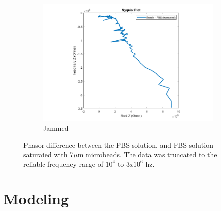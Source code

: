 \begin{figure}[h]
    \begin{subfigure}[b]{\textwidth}
        \centering
        \includegraphics[width=\textwidth]{images/IS_data_beads-PBS_nyquist.png}
        \caption{Jammed}
    \end{subfigure}
    \caption[Truncated phasor difference between PBS, and micro-bead saturated PBS.]{Phasor difference between the PBS solution, and PBS solution saturated with 7$\mu$m microbeads. The data was truncated to the reliable frequency range of $10^4$ to $3x10^6$ hz.}
    \label{fig:IS_data_beads_pbs_DI_comp}
\end{figure}


\FloatBarrier

\section{Modeling}

